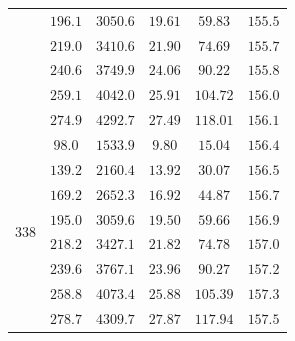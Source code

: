 \documentclass[a4paper,12pt]{article}
\begin{document}
\begin{tabular}{|c|c|c|c|c|c|}
                & $196.1$                 & $3050.6$                  & $19.61$        & $59.83$         & $155.5$                   \\\cline{2-6}
                & $219.0$                 & $3410.6$                  & $21.90$        & $74.69$         & $155.7$                   \\\cline{2-6}
                & $240.6$                 & $3749.9$                  & $24.06$        & $90.22$         & $155.8$                   \\\cline{2-6}
                & $259.1$                 & $4042.0$                  & $25.91$        & $104.72$        & $156.0$                   \\\cline{2-6}
                & $274.9$                 & $4292.7$                  & $27.49$        & $118.01$        & $156.1$                   \\\hline
  \multirow{8}{*}{338}
                & $98.0$                  & $1533.9$                  & $9.80$         & $15.04$         & $156.4$                   \\\cline{2-6}
                & $139.2$                 & $2160.4$                  & $13.92$        & $30.07$         & $156.5$                   \\\cline{2-6}
                & $169.2$                 & $2652.3$                  & $16.92$        & $44.87$         & $156.7$                   \\\cline{2-6}
                & $195.0$                 & $3059.6$                  & $19.50$        & $59.66$         & $156.9$                   \\\cline{2-6}
                & $218.2$                 & $3427.1$                  & $21.82$        & $74.78$         & $157.0$                   \\\cline{2-6}
                & $239.6$                 & $3767.1$                  & $23.96$        & $90.27$         & $157.2$                   \\\cline{2-6}
                & $258.8$                 & $4073.4$                  & $25.88$        & $105.39$        & $157.3$                   \\\cline{2-6}
                & $278.7$                 & $4309.7$                  & $27.87$        & $117.94$        & $157.5$                   \\\hline
\end{tabular} \\\\\\
\end{document}
